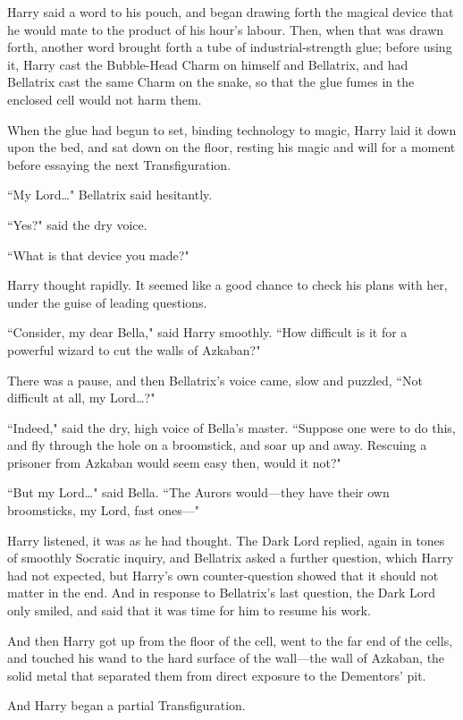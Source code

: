 Harry said a word to his pouch, and began drawing forth the magical device that he would mate to the product of his hour's labour. Then, when that was drawn forth, another word brought forth a tube of industrial-strength glue; before using it, Harry cast the Bubble-Head Charm on himself and Bellatrix, and had Bellatrix cast the same Charm on the snake, so that the glue fumes in the enclosed cell would not harm them.

When the glue had begun to set, binding technology to magic, Harry laid it down upon the bed, and sat down on the floor, resting his magic and will for a moment before essaying the next Transfiguration.

``My Lord{\ldots}" Bellatrix said hesitantly.

``Yes?" said the dry voice.

``What is that device you made?"

Harry thought rapidly. It seemed like a good chance to check his plans with her, under the guise of leading questions.

``Consider, my dear Bella," said Harry smoothly. ``How difficult is it for a powerful wizard to cut the walls of Azkaban?"

There was a pause, and then Bellatrix's voice came, slow and puzzled, ``Not difficult at all, my Lord{\ldots}?"

``Indeed," said the dry, high voice of Bella's master. ``Suppose one were to do this, and fly through the hole on a broomstick, and soar up and away. Rescuing a prisoner from Azkaban would seem easy then, would it not?"

``But my Lord{\ldots}" said Bella. ``The Aurors would---they have their own broomsticks, my Lord, fast ones---"

Harry listened, it was as he had thought. The Dark Lord replied, again in tones of smoothly Socratic inquiry, and Bellatrix asked a further question, which Harry had not expected, but Harry's own counter-question showed that it should not matter in the end. And in response to Bellatrix's last question, the Dark Lord only smiled, and said that it was time for him to resume his work.

And then Harry got up from the floor of the cell, went to the far end of the cells, and touched his wand to the hard surface of the wall---the wall of Azkaban, the solid metal that separated them from direct exposure to the Dementors' pit.

And Harry began a partial Transfiguration.

